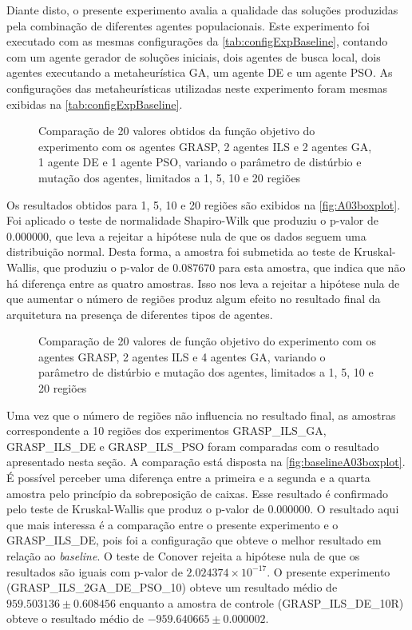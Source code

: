 Diante disto, o presente experimento avalia a qualidade das soluções produzidas pela combinação de diferentes agentes populacionais. Este experimento foi executado com as mesmas configurações da \autoref{tab:configExpBaseline}, contando com um agente gerador de soluções iniciais, dois agentes de busca local, dois agentes executando a metaheurística GA, um agente DE e um agente PSO. As configurações das metaheurísticas utilizadas neste experimento foram mesmas exibidas na \autoref{tab:configExpBaseline}.

\begin{figure}
    \centering
    \caption{Comparação de 20 valores obtidos da função objetivo do experimento com os agentes GRASP, 2 agentes ILS e 2 agentes GA, 1 agente DE e 1 agente PSO, variando o parâmetro de distúrbio e mutação dos agentes, limitados a 1, 5, 10 e 20 regiões}
    
    \label{fig:A03boxplot}
\end{figure}

Os resultados obtidos para 1, 5, 10 e 20 regiões são exibidos na \autoref{fig:A03boxplot}. Foi aplicado o teste de normalidade Shapiro-Wilk que produziu o p-valor de $0.000000$, que leva a rejeitar a hipótese nula de que os dados seguem uma distribuição normal. Desta forma, a amostra foi submetida ao teste de Kruskal-Wallis, que produziu o p-valor de $0.087670$ para esta amostra, que indica que não há diferença entre as quatro amostras. Isso nos leva a rejeitar a hipótese nula de que aumentar o número de regiões produz algum efeito no resultado final da arquitetura na presença de diferentes tipos de agentes. 

\begin{figure}
    \centering
    \caption{Comparação de 20 valores de função objetivo do experimento com os agentes GRASP, 2 agentes ILS e 4 agentes GA, variando o parâmetro de distúrbio e mutação dos agentes, limitados a 1, 5, 10 e 20 regiões}
    
    \label{fig:baselineA03boxplot}
\end{figure}

Uma vez que o número de  regiões não influencia no resultado final, as amostras correspondente a 10 regiões dos experimentos GRASP\_ILS\_GA, GRASP\_ILS\_DE e GRASP\_ILS\_PSO foram comparadas com o resultado apresentado nesta seção. A comparação está disposta na \autoref{fig:baselineA03boxplot}. É possível perceber uma diferença entre a primeira e a segunda e a quarta amostra pelo princípio da sobreposição de caixas. Esse resultado é confirmado pelo teste de Kruskal-Wallis que produz o p-valor de $0.000000$. O resultado aqui que mais interessa é a comparação entre o presente experimento e o  GRASP\_ILS\_DE, pois foi a configuração que obteve o melhor resultado em relação ao \textit{baseline}. O teste de Conover rejeita a hipótese nula de que os resultados são iguais com p-valor de $2.024374 \times 10^{-17}$. O presente experimento (GRASP\_ILS\_2GA\_DE\_PSO\_10) obteve um resultado médio de $959.503136 \pm 0.608456$ enquanto a amostra de controle (GRASP\_ILS\_DE\_10R) obteve o resultado médio de $-959.640665 \pm 0.000002$. 


